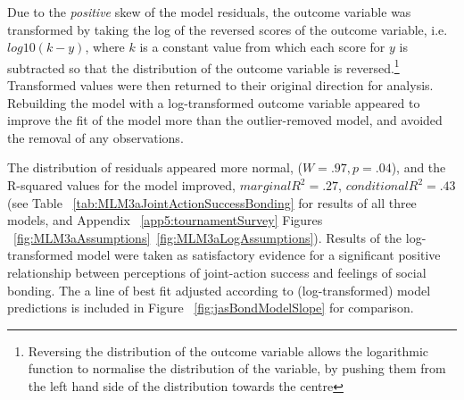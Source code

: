 Due to the \textit{positive} skew of the model residuals, the outcome variable was transformed by taking the log of the reversed scores of the outcome variable, i.e. $log10(k - y)$, where $k$ is a constant value from which each score for $y$ is subtracted so that the distribution of the outcome variable is reversed\citep{Howell2012}.\footnote{Reversing the distribution of the outcome variable allows the logarithmic function to normalise the distribution of the variable, by pushing them from the left hand side of the distribution towards the centre}  Transformed values were then returned to their original direction for analysis\citep{Field2012}.  Rebuilding the model with a log-transformed outcome variable appeared to improve the fit of the model more than the outlier-removed model, and avoided the removal of any observations.

The distribution of residuals appeared more normal, ($W = .97, p = .04$), and the R-squared values for the model improved, $marginal R^2 = .27$, $conditional R^2 = .43$ (see Table ~\ref{tab:MLM3aJointActionSuccessBonding} for results of all three models, and Appendix ~\ref{app5:tournamentSurvey} Figures ~\ref{fig:MLM3aAssumptions}\nobreakdash~\ref{fig:MLM3aLogAssumptions}). Results of the log-transformed model were taken as satisfactory evidence for a significant positive relationship between perceptions of joint-action success and feelings of social bonding.  The a line of best fit adjusted according to (log-transformed) model predictions is included in Figure ~\ref{fig:jasBondModelSlope} for comparison.
  


